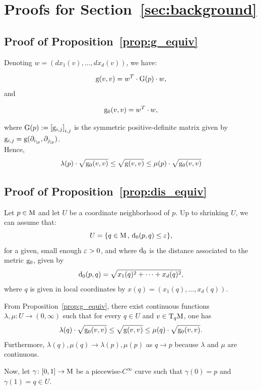 \section{Proofs for Section~\ref{sec:background}}\label{apdx:proofs}
\subsection{Proof of Proposition~\ref{prop:g_equiv}}
Denoting $w=(dx_1(v),...,dx_d(v))$, we have:

$$\mathrm{g}(v,v)=w^T\cdot \mathrm{G}(p)\cdot w,$$
and 

$$\mathrm{g}_0(v,v)=w^T\cdot w,$$

where $\mathrm{G}(p):=\left[\mathrm{g}_{i,j}\right]_{i,j}$ is the symmetric positive-definite matrix given by $\mathrm{g}_{i,j}=\mathrm{g}(\partial_{i_{|p}},\partial_{j_{|p}})$.\\

Hence,
$$\lambda(p)\cdot \sqrt{\mathrm{g}_0(v,v)}\leq \sqrt{\mathrm{g}(v,v)}\leq \mu(p)\cdot \sqrt{\mathrm{g}_0(v,v)}$$

\subsection{Proof of Proposition~\ref{prop:dis_equiv}}

Let $p\in\mathrm{M}$ and let $U$ be a coordinate neighborhood of $p$.
Up to shrinking $U$, we can assume that:
$$U=\{q\in\mathrm{M}\, ,\, \mathrm{d}_0(p,q)\leq\varepsilon\},$$
for a given, small enough $\varepsilon>0$, and where $\mathrm{d}_0$ is the distance associated to the metric $\mathrm{g}_0$, given by 
$$\mathrm{d}_0(p,q)=\sqrt{x_1(q)^2+\dots+x_d(q)^2},$$
where $q$ is given in local coordinates by $x(q)=(x_1(q),...,x_d(q))$.

From Proposition~\ref{prop:g_equiv}, there exist continuous functions $\lambda,\mu\colon U\rightarrow(0,\infty)$ such that for every $q\in U$ and $v\in\mathrm{T}_q\mathrm{M}$, one has
$$\lambda(q)\cdot \sqrt{\mathrm{g}_0(v,v)}\leq \sqrt{\mathrm{g}(v,v)}\leq \mu(q)\cdot \sqrt{\mathrm{g}_0(v,v)}.$$
Furthermore, $\lambda(q),\mu(q)\rightarrow \lambda(p),\mu(p)$ as $q\rightarrow p$ because $\lambda$ and $\mu$ are continuous.

Now, let $\gamma\colon[0,1]\rightarrow\mathrm{M}$ be a piecewise-$C^{\infty}$ curve such that $\gamma(0)=p$ and $\gamma(1)=q\in U$.

